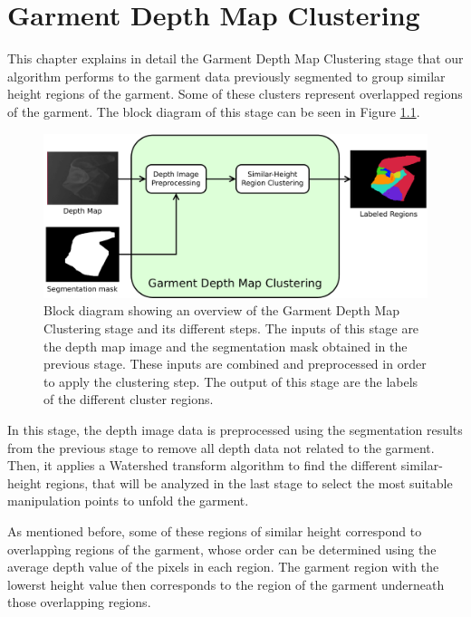 \chapter{Garment Depth Map Clustering}
\label{garment_clustering}

This chapter explains in detail the Garment Depth Map Clustering stage that our algorithm performs to the garment data previously segmented to group similar height regions of the garment. Some of these clusters represent overlapped regions of the garment. The block diagram of this stage can be seen in Figure \ref{fig:garment_clustering_blocks}.

\begin{figure}[thpb]
    \centering
    \includegraphics[width=\textwidth]
    {figures/Garment-depthmap-diagram.pdf}
    \caption{Block diagram showing an overview of the Garment Depth Map Clustering stage and its different steps. The inputs of this stage are the depth map image and the segmentation mask obtained in the previous stage. These inputs are combined and preprocessed in order to apply the clustering step. The output of this stage are the labels of the different cluster regions.}
    \label{fig:garment_clustering_blocks}
\end{figure}

In this stage, the depth image data is preprocessed using the segmentation results from the previous stage to remove all depth data not related to the garment. Then, it applies a Watershed transform algorithm to find the different similar-height regions, that will be analyzed in the last stage to select the most suitable manipulation points to unfold the garment. 

As mentioned before, some of these regions of similar height correspond to overlappìng regions of the garment, whose order can be determined using the average depth value of the pixels in each region. The garment region with the lowerst height value then corresponds to the region of the garment underneath those overlapping regions.


